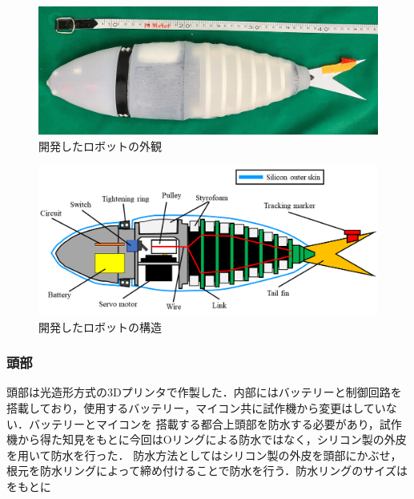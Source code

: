 \begin{figure}[htbp]
    \centering
    \includegraphics[width=0.9\linewidth]{chapters/picture/withskin.jpg}
    \caption{開発したロボットの外観}
    \label{fig:fishrobo}
\end{figure}
\begin{figure}[htbp]
    \centering
    \includegraphics[width=0.9\linewidth]{chapters/picture/fish.png}
    \caption{開発したロボットの構造}
    \label{fig:kouzou}
\end{figure}

\subsubsection{頭部}
頭部は光造形方式の3Dプリンタで作製した．内部にはバッテリーと制御回路を搭載しており，使用するバッテリー，マイコン共に試作機から変更はしていない．バッテリーとマイコンを
搭載する都合上頭部を防水する必要があり，試作機から得た知見をもとに今回はOリングによる防水ではなく，シリコン製の外皮を用いて防水を行った．
防水方法としてはシリコン製の外皮を頭部にかぶせ，根元を防水リングによって締め付けることで防水を行う．防水リングのサイズはをもとに
